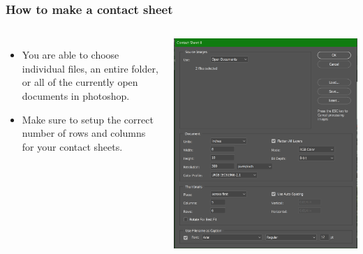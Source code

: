 \documentclass{beamer}
\begin{document}
	\begin{frame}
	\frametitle{How to make a contact sheet}
	\begin{columns}
		\vspace{-25pt}
		\begin{itemize}
			\item You are able to choose individual files, an entire folder, or all of the currently open documents in photoshop.  
			\item Make sure to setup the correct number of rows and columns for your contact sheets.  
		\end{itemize}
		\includegraphics[width=.85\textwidth]{images/contact3.jpg}
	\end{columns}
\end{frame}

	\section{}	
\end{document}
